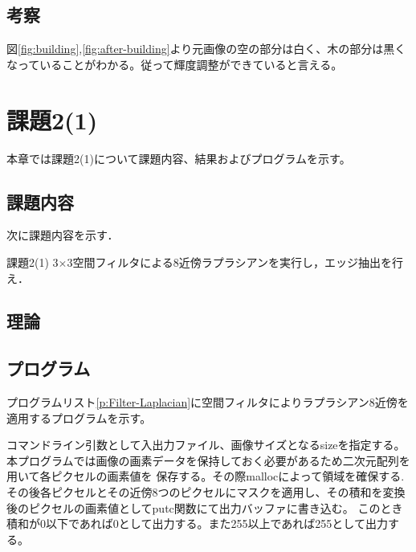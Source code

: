 \documentclass[11pt,a4paper,titlepage,dvipdfmx]{jarticle}
\begin{document}
  \subsection{考察}
    図\ref{fig:building},\ref{fig:after-building}より元画像の空の部分は白く、木の部分は黒くなっていることがわかる。従って輝度調整ができていると言える。

\section{課題2(1)}
  本章では課題2(1)について課題内容、結果およびプログラムを示す。
  \subsection{課題内容}
    次に課題内容を示す．
    \begin{itembox}[l]{課題2(1)}
      3$\times$3空間フィルタによる8近傍ラプラシアンを実行し，エッジ抽出を行え．
    \end{itembox}
  \subsection{理論}
  \subsection{プログラム}
    プログラムリスト\ref{p:Filter-Laplacian}に空間フィルタによりラプラシアン8近傍を適用するプログラムを示す。
    

    コマンドライン引数として入出力ファイル、画像サイズとなるsizeを指定する。本プログラムでは画像の画素データを保持しておく必要があるため二次元配列を用いて各ピクセルの画素値を
    保存する。その際mallocによって領域を確保する.その後各ピクセルとその近傍8つのピクセルにマスクを適用し、その積和を変換後のピクセルの画素値としてputc関数にて出力バッファに書き込む。
    このとき積和が0以下であれば0として出力する。また255以上であれば255として出力する。
  
\end{document}
